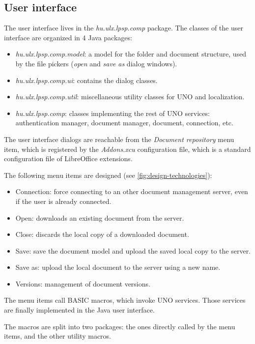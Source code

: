 \subsection{User interface}

The user interface lives in the \emph{hu.ulx.lpsp.comp} package. The classes of
the user interface are organized in 4 Java packages:

\begin{itemize}
\item \emph{hu.ulx.lpsp.comp.model}: a model for the folder and document
structure, used by the file pickers (\emph{open} and \emph{save as} dialog
windows).
\item \emph{hu.ulx.lpsp.comp.ui}: contains the dialog classes.
\item \emph{hu.ulx.lpsp.comp.util}: miscellaneous utility classes for UNO and localization.
\item \emph{hu.ulx.lpsp.comp}: classes implementing the rest of UNO
services: authentication manager, document manager, document, connection, etc.
\end{itemize}

The user interface dialogs are reachable from the \emph{Document repository}
menu item, which is registered by the \emph{Addons.xcu} configuration file,
which is a standard configuration file of LibreOffice extensions.

The following menu items are designed (see \autoref{fig:design-technologies}):

\begin{itemize}
\item Connection: force connecting to an other document management server, even
if the user is already connected.
\item Open: downloads an existing document from the server.
\item Close: discards the local copy of a downloaded document.
\item Save: save the document model and upload the saved local copy to the server.
\item Save as: upload the local document to the server using a new name.
\item Versions: management of document versions.
\end{itemize}

The menu items call BASIC macros, which invoke UNO services. Those services are
finally implemented in the Java user interface.

The macros are split into two packages: the ones directly called by the menu
items, and the other utility macros.


